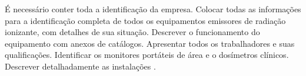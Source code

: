 \documentclass[
	12pt,				%
    oneside,			%
	a4paper,			%
	english,			%
	french,				%
	spanish,			%
	brazil,				%
	]{abntex2}
\begin{document}
É necessário conter toda a identificação da empresa. Colocar todas as informações para a identificação completa de todos os equipamentos emissores de radiação ionizante, com detalhes de sua situação. Descrever o funcionamento do equipamento com anexos de catálogos. Apresentar todos os trabalhadores e suas qualificações. Identificar os monitores portáteis de área e o dosímetros clínicos. Descrever detalhadamente as instalações \cite{talbot2012}.





\postextual


% 

%
%






\end{document}

